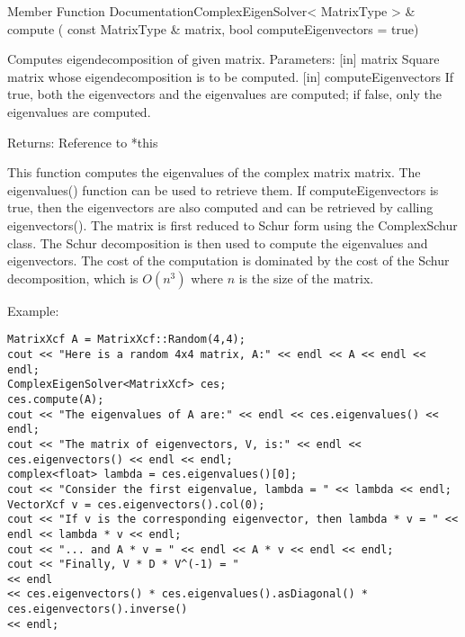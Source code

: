 \vspace{0.3cm}
Member Function DocumentationComplexEigenSolver< MatrixType > \& compute  ( const MatrixType \&  matrix, bool  computeEigenvectors = true)   

Computes eigendecomposition of given matrix. 
Parameters: [in] matrix Square matrix whose eigendecomposition is to be computed.  
[in] computeEigenvectors If true, both the eigenvectors and the eigenvalues are computed; if false, only the eigenvalues are computed.  

Returns: Reference to *this 

This function computes the eigenvalues of the complex matrix matrix. The eigenvalues() function can be used to retrieve them. If computeEigenvectors is true, then the eigenvectors are also computed and can be retrieved by calling eigenvectors().
The matrix is first reduced to Schur form using the ComplexSchur class. The Schur decomposition is then used to compute the eigenvalues and eigenvectors.
The cost of the computation is dominated by the cost of the Schur decomposition, which is $O(n^3)$ where $n$ is the size of the matrix.


Example:
\begin{lstlisting}
MatrixXcf A = MatrixXcf::Random(4,4);
cout << "Here is a random 4x4 matrix, A:" << endl << A << endl << endl;
ComplexEigenSolver<MatrixXcf> ces;
ces.compute(A);
cout << "The eigenvalues of A are:" << endl << ces.eigenvalues() << endl;
cout << "The matrix of eigenvectors, V, is:" << endl << ces.eigenvectors() << endl << endl;
complex<float> lambda = ces.eigenvalues()[0];
cout << "Consider the first eigenvalue, lambda = " << lambda << endl;
VectorXcf v = ces.eigenvectors().col(0);
cout << "If v is the corresponding eigenvector, then lambda * v = " << endl << lambda * v << endl;
cout << "... and A * v = " << endl << A * v << endl << endl;
cout << "Finally, V * D * V^(-1) = " 
<< endl     
<< ces.eigenvectors() * ces.eigenvalues().asDiagonal() * ces.eigenvectors().inverse() 
<< endl;
\end{lstlisting}

